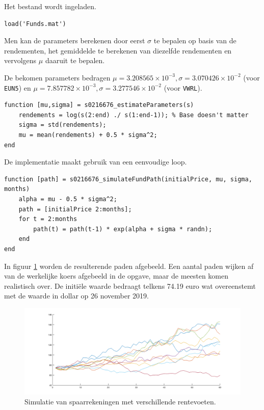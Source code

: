 

Het bestand wordt ingeladen.

\begin{lstlisting}
load('Funds.mat')
\end{lstlisting}



Men kan de parameters berekenen door eerst $\sigma$ te bepalen op basis van de rendementen, het gemiddelde te berekenen van diezelfde rendementen en vervolgens $\mu$ daaruit te bepalen.\\
\par\noindent De bekomen parameters bedragen $\mu = 3.208565\times 10^{-3}, \sigma = 3.070426\times 10^{-2}$ (voor \texttt{EUN5}) en $\mu = 7.857782\times 10^{-3}, \sigma = 3.277546\times 10^{-2}$ (voor \texttt{VWRL}).

\begin{lstlisting}
function [mu,sigma] = s0216676_estimateParameters(s)
    rendements = log(s(2:end) ./ s(1:end-1)); % Base doesn't matter
    sigma = std(rendements);
    mu = mean(rendements) + 0.5 * sigma^2;
end
\end{lstlisting}



De implementatie maakt gebruik van een eenvoudige  loop.

\begin{lstlisting}
function [path] = s0216676_simulateFundPath(initialPrice, mu, sigma, months)
    alpha = mu - 0.5 * sigma^2;
    path = [initialPrice 2:months];
    for t = 2:months
        path(t) = path(t-1) * exp(alpha + sigma * randn);
    end
end
\end{lstlisting}



In figuur \ref{fig:op6} worden de resulterende paden afgebeeld. Een aantal paden wijken af van de werkelijke koers afgebeeld in de opgave, maar de meesten komen realistisch over. De initi\"ele waarde bedraagt telkens 74.19 euro wat overeenstemt met de waarde in dollar op 26 november 2019.

\begin{figure}[h]
\centering
\includegraphics[width=\textwidth]{res/op6.png}
\caption{Simulatie van spaarrekeningen met verschillende rentevoeten.}
\label{fig:op6}
\end{figure}

